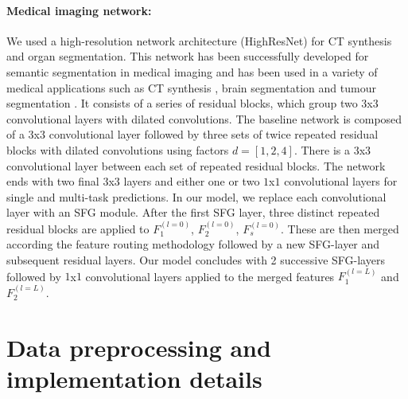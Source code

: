     \paragraph{Medical imaging network:} We used a high-resolution network architecture (HighResNet) \cite{wenqi} for CT synthesis and organ segmentation. This network has been successfully developed for semantic segmentation in medical imaging and has been used in a variety of medical applications such as CT synthesis \cite{bragman2018multi, kerstin}, brain segmentation \cite{wenqi} and tumour segmentation \cite{zach}. It consists of a series of residual blocks, which group two $3$x$3$ convolutional layers with dilated convolutions. The baseline network is composed of a $3$x$3$ convolutional layer followed by three sets of twice repeated residual blocks with dilated convolutions using factors $d=[1, 2, 4]$. There is a $3$x$3$ convolutional layer between each set of repeated residual blocks. The network ends with two final $3$x$3$ layers and either one or two $1$x$1$ convolutional layers for single and multi-task predictions. In our model, we replace each convolutional layer with an SFG module. After the first SFG layer, three distinct repeated residual blocks are applied to $F^{(l=0)}_{1}$, $F^{(l=0)}_{2}$, $F^{(l=0)}_{s}$. These are then merged according the feature routing methodology followed by a new SFG-layer and subsequent residual layers. Our model concludes with 2 successive SFG-layers followed by $1$x$1$ convolutional layers applied to the merged features $F^{(l=L)}_{1}$ and $F^{(l=L)}_{2}$. 





\section{Data preprocessing and implementation details}

